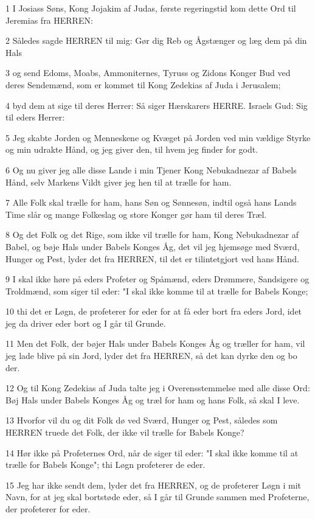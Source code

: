 \par 1 I Josiass Søns, Kong Jojakim af Judas, første regeringstid kom dette Ord til Jeremias fra HERREN:
\par 2 Således sagde HERREN til mig: Gør dig Reb og Ågstænger og læg dem på din Hals
\par 3 og send Edoms, Moabs, Ammoniternes, Tyruss og Zidons Konger Bud ved deres Sendemænd, som er kommet til Kong Zedekias af Juda i Jerusalem;
\par 4 byd dem at sige til deres Herrer: Så siger Hærskarers HERRE. Israels Gud: Sig til eders Herrer:
\par 5 Jeg skabte Jorden og Menneskene og Kvæget på Jorden ved min vældige Styrke og min udrakte Hånd, og jeg giver den, til hvem jeg finder for godt.
\par 6 Og nu giver jeg alle disse Lande i min Tjener Kong Nebukadnezar af Babels Hånd, selv Markens Vildt giver jeg hen til at trælle for ham.
\par 7 Alle Folk skal trælle for ham, hans Søn og Sønnesøn, indtil også hans Lands Time slår og mange Folkeslag og store Konger gør ham til deres Træl.
\par 8 Og det Folk og det Rige, som ikke vil trælle for ham, Kong Nebukadnezar af Babel, og bøje Hals under Babels Konges Åg, det vil jeg hjemsøge med Sværd, Hunger og Pest, lyder det fra HERREN, til det er tilintetgjort ved hans Hånd.
\par 9 I skal ikke høre på eders Profeter og Spåmænd, eders Drømmere, Sandsigere og Troldmænd, som siger til eder: "I skal ikke komme til at trælle for Babels Konge;
\par 10 thi det er Løgn, de profeterer for eder for at få eder bort fra eders Jord, idet jeg da driver eder bort og I går til Grunde.
\par 11 Men det Folk, der bøjer Hals under Babels Konges Åg og træller for ham, vil jeg lade blive på sin Jord, lyder det fra HERREN, så det kan dyrke den og bo der.
\par 12 Og til Kong Zedekias af Juda talte jeg i Overensstemmelse med alle disse Ord: Bøj Hals under Babels Konges Åg og træl for ham og hans Folk, så skal I leve.
\par 13 Hvorfor vil du og dit Folk dø ved Sværd, Hunger og Pest, således som HERREN truede det Folk, der ikke vil trælle for Babels Konge?
\par 14 Hør ikke på Profeternes Ord, når de siger til eder: "I skal ikke komme til at trælle for Babels Konge"; thi Løgn profeterer de eder.
\par 15 Jeg har ikke sendt dem, lyder det fra HERREN, og de profeterer Løgn i mit Navn, for at jeg skal bortstøde eder, så I går til Grunde sammen med Profeterne, der profeterer for eder.
